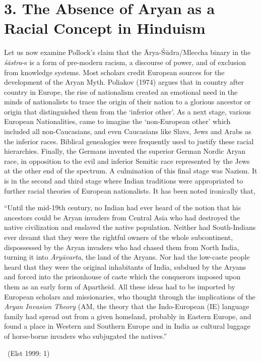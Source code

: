 \section*{3. The Absence of Aryan as \hfill\break a Racial Concept in Hinduism}

Let us now examine Pollock’s claim that the Ārya-Śūdra/Mleccha binary in the \textit{śāstra}-s  is a form of pre-modern racism, a discourse of power, and of exclusion from knowledge systems. Most scholars credit European sources for the development of the Aryan Myth. Poliakov (1974) argues that in country after country in Europe, the rise of nationalism created an emotional need in the minds of nationalists to trace the origin of their nation to a glorious ancestor or origin that distinguished them from the ‘inferior other’. As a next stage, various European Nationalities, came to imagine the ‘non-European other’ which included all non-Caucasians, and even Caucasians like Slavs, Jews and Arabs as the inferior races. Biblical genealogies were frequently used to justify these racial hierarchies. Finally, the Germans invented the superior German Nordic Aryan race, in opposition to the evil and inferior Semitic race represented by the Jews at the other end of the spectrum. A culmination of this final stage was Nazism. It is in the second and third stage where Indian traditions were appropriated to further racial theories of European nationalists. It has been noted ironically that,

\begin{myquote}
“Until the mid-19th century, no Indian had ever heard of the notion that his ancestors could be Aryan invaders from Central Asia who had destroyed the native civilization and enslaved the native population. Neither had South-Indians ever dreamt that they were the rightful owners of the whole subcontinent, dispossessed by the Aryan invaders who had chased them from North India, turning it into \textit{Āryāvarta}, the land of the Aryans. Nor had the low-caste people heard that they were the original inhabitants of India, subdued by the Aryans and forced into the prisonhouse of caste which the conquerors imposed upon them as an early form of Apartheid. All these ideas had to be imported by European scholars and missionaries, who thought through the implications of the \textit{Aryan Invasion Theory} (AM, the theory that the Indo-European (IE) language family had spread out from a given homeland, probably in Eastern Europe, and found a place in Western and Southern Europe and in India as cultural luggage of horse-borne invaders who subjugated the natives.” 

~\hfill (Elst 1999: 1)
\end{myquote}

